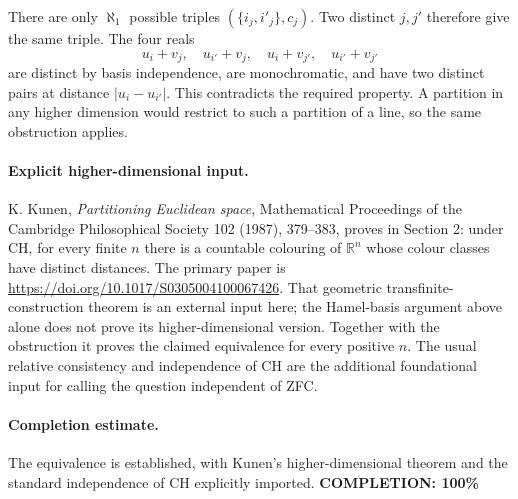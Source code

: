 There are only \(\aleph_1\) possible triples \((\{i_j,i'_j\},c_j)\). Two distinct \(j,j'\) therefore give the same triple. The four reals
\[
 u_i+v_j,\quad u_{i'}+v_j,\quad u_i+v_{j'},\quad u_{i'}+v_{j'}
\]
are distinct by basis independence, are monochromatic, and have two distinct pairs at distance \(|u_i-u_{i'}|\). This contradicts the required property.
A partition in any higher dimension would restrict to such a partition of a line, so the same obstruction applies.

\paragraph{Explicit higher-dimensional input.}
K. Kunen, \emph{Partitioning Euclidean space}, Mathematical Proceedings of the Cambridge Philosophical Society 102 (1987), 379--383, proves in Section 2: under CH, for every finite \(n\) there is a countable colouring of \(\mathbb R^n\) whose colour classes have distinct distances.
The primary paper is \url{https://doi.org/10.1017/S0305004100067426}.
That geometric transfinite-construction theorem is an external input here; the Hamel-basis argument above alone does not prove its higher-dimensional version. Together with the obstruction it proves the claimed equivalence for every positive \(n\).
The usual relative consistency and independence of CH are the additional foundational input for calling the question independent of ZFC.

\paragraph{Completion estimate.}
The equivalence is established, with Kunen's higher-dimensional theorem and the standard independence of CH explicitly imported.
\textbf{COMPLETION: 100\%}
